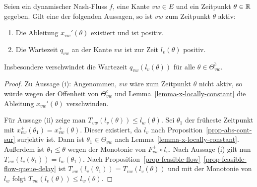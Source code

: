 \begin{lemma}\label{lemma-nash-flow-waiting-queue-implies-active-edge}
	Seien ein dynamischer Nash-Fluss $f$, eine Kante $vw\in E$ und ein Zeitpunkt $\theta\in\mathbb{R}$ gegeben.
	Gilt eine der folgenden Aussagen, so ist $vw$ zum Zeitpunkt $\theta$ aktiv:
	\begin{enumerate}[label=(\roman*)]
		\item Die Ableitung $x_{vw}'(\theta)$ existiert und ist positiv.
		\item Die Wartezeit $q_{vw}$ an der Kante $vw$ ist zur Zeit $l_v(\theta)$ positiv.
	\end{enumerate}
	Insbesondere verschwindet die Wartezeit $q_{vw}(l_v(\theta))$ für alle $\theta\in\overline{\Theta_{vw}^c}$.
\end{lemma}
\begin{proof}
	Zu Aussage (i): Angenommen, $vw$ wäre zum Zeitpunkt $\theta$ nicht aktiv, so würde wegen der Offenheit von $\Theta_{vw}^c$ und Lemma~\ref{lemma-x-locally-constant} die Ableitung $x_{vw}'(\theta)$ verschwinden.
	
	Für Aussage (ii) zeige man $T_{vw}(l_v(\theta)) \leq l_w(\theta)$.
	Sei $\theta_1$ der früheste Zeitpunkt mit $x_{vw}^+(\theta_1)= x_{vw}^+(\theta)$.
	Dieser existiert, da $l_v$ nach Proposition~\ref{prop-abs-cont-sur} surjektiv ist.
	Dann ist $\theta_1\in \Theta_{vw}$ nach Lemma~\ref{lemma-x-locally-constant}.
	Außerdem ist $\theta_1 \leq \theta$ wegen der Monotonie von $F_{vw}^+ \circ l_v$.
	Nach Aussage (i) gilt nun $T_{vw}(l_v(\theta_1)) = l_w(\theta_1)$.
	Nach Proposition~\ref{prop-feasible-flow}~\ref{prop-feasible-flow-queue-delay} ist $T_{vw}(l_v(\theta_1)) = T_{vw}(l_v(\theta))$ und mit der Monotonie von $l_w$ folgt $T_{vw}(l_v(\theta))\leq l_w(\theta)$.
\end{proof}

